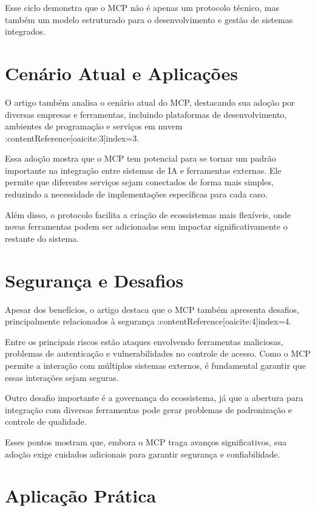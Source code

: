 \documentclass[conference]{IEEEtran}
\begin{document}
Esse ciclo demonstra que o MCP não é apenas um protocolo técnico, mas também um modelo estruturado para o desenvolvimento e gestão de sistemas integrados.

\section{Cenário Atual e Aplicações}

O artigo também analisa o cenário atual do MCP, destacando sua adoção por diversas empresas e ferramentas, incluindo plataformas de desenvolvimento, ambientes de programação e serviços em nuvem :contentReference[oaicite:3]{index=3}.

Essa adoção mostra que o MCP tem potencial para se tornar um padrão importante na integração entre sistemas de IA e ferramentas externas. Ele permite que diferentes serviços sejam conectados de forma mais simples, reduzindo a necessidade de implementações específicas para cada caso.

Além disso, o protocolo facilita a criação de ecossistemas mais flexíveis, onde novas ferramentas podem ser adicionadas sem impactar significativamente o restante do sistema.

\section{Segurança e Desafios}

Apesar dos benefícios, o artigo destaca que o MCP também apresenta desafios, principalmente relacionados à segurança :contentReference[oaicite:4]{index=4}.

Entre os principais riscos estão ataques envolvendo ferramentas maliciosas, problemas de autenticação e vulnerabilidades no controle de acesso. Como o MCP permite a interação com múltiplos sistemas externos, é fundamental garantir que essas interações sejam seguras.

Outro desafio importante é a governança do ecossistema, já que a abertura para integração com diversas ferramentas pode gerar problemas de padronização e controle de qualidade.

Esses pontos mostram que, embora o MCP traga avanços significativos, sua adoção exige cuidados adicionais para garantir segurança e confiabilidade.

\section{Aplicação Prática}
\end{document}
